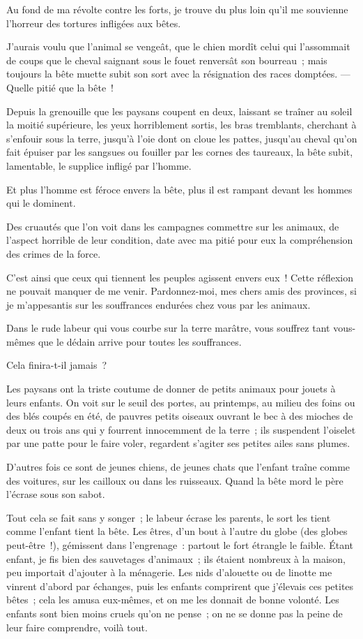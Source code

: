\documentclass[french,twoside]{book} %
\newcommand\chaptercont{} %
\begin{document}
\chaptercont
\noindent Au fond de ma révolte contre les forts, je trouve du plus loin qu’il me souvienne l’horreur des tortures infligées aux bêtes.\par
J’aurais voulu que l’animal se vengeât, que le chien mordît celui qui l’assommait de coups que le cheval saignant sous le fouet renversât son bourreau ; mais toujours la bête muette subit son sort avec la résignation des races domptées. — Quelle pitié que la bête !\par
Depuis la grenouille que les paysans coupent en deux, laissant se traîner au soleil la moitié supérieure, les yeux horriblement sortis, les bras tremblants, cherchant à s’enfouir sous la terre, jusqu’à l’oie dont on cloue les pattes, jusqu’au cheval qu’on fait épuiser par les sangsues ou fouiller par les cornes des taureaux, la bête subit, lamentable, le supplice infligé par l’homme.\par
Et plus l’homme est féroce envers la bête,  plus il est rampant devant les hommes qui le dominent.\par
Des cruautés que l’on voit dans les campagnes commettre sur les animaux, de l’aspect horrible de leur condition, date avec ma pitié pour eux la compréhension des crimes de la force.\par
C’est ainsi que ceux qui tiennent les peuples agissent envers eux ! Cette réflexion ne pouvait manquer de me venir. Pardonnez-moi, mes chers amis des provinces, si je m’appesantis sur les souffrances endurées chez vous par les animaux.\par
Dans le rude labeur qui vous courbe sur la terre marâtre, vous souffrez tant vous-mêmes que le dédain arrive pour toutes les souffrances.\par
Cela finira-t-il jamais ?\par
Les paysans ont la triste coutume de donner de petits animaux pour jouets à leurs enfants. On voit sur le seuil des portes, au printemps, au milieu des foins ou des blés coupés en été, de pauvres petits oiseaux ouvrant le bec à des mioches de deux ou trois ans qui y fourrent innocemment de la terre ; ils suspendent l’oiselet par une patte pour le faire voler, regardent s’agiter ses petites ailes sans plumes.\par
D’autres fois ce sont de jeunes chiens, de jeunes chats que l’enfant traîne comme des voitures, sur les cailloux ou dans les ruisseaux.  Quand la bête mord le père l’écrase sous son sabot.\par
Tout cela se fait sans y songer ; le labeur écrase les parents, le sort les tient comme l’enfant tient la bête. Les êtres, d’un bout à l’autre du globe (des globes peut-être !), gémissent dans l’engrenage : partout le fort étrangle le faible. Étant enfant, je fis bien des sauvetages d’animaux ; ils étaient nombreux à la maison, peu importait d’ajouter à la ménagerie. Les nids d’alouette ou de linotte me vinrent d’abord par échanges, puis les enfants comprirent que j’élevais ces petites bêtes ; cela les amusa eux-mêmes, et on me les donnait de bonne volonté. Les enfants sont bien moins cruels qu’on ne pense ; on ne se donne pas la peine de leur faire comprendre, voilà tout.\par
\end{document}
